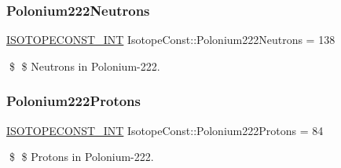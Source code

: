 \subsubsection{\texorpdfstring{Polonium222\+Neutrons}{Polonium222Neutrons}}
{\footnotesize\ttfamily \mbox{\hyperlink{group___isotope_const-_macros_ga5f18360b3e99483a35c32d789e62621c}{I\+S\+O\+T\+O\+P\+E\+C\+O\+N\+S\+T\+\_\+\+I\+NT}} Isotope\+Const\+::\+Polonium222\+Neutrons = 138}

\$ \$ Neutrons in Polonium-\/222. \mbox{\label{group___isotope_const-_polonium-_po222_gab14a8c18be93b3e76caa416d22e50abd}} 
\subsubsection{\texorpdfstring{Polonium222\+Protons}{Polonium222Protons}}
{\footnotesize\ttfamily \mbox{\hyperlink{group___isotope_const-_macros_ga5f18360b3e99483a35c32d789e62621c}{I\+S\+O\+T\+O\+P\+E\+C\+O\+N\+S\+T\+\_\+\+I\+NT}} Isotope\+Const\+::\+Polonium222\+Protons = 84}

\$ \$ Protons in Polonium-\/222. 